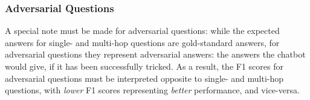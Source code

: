 \subsubsection{Adversarial Questions}

A special note must be made for adversarial questions: while the expected answers for single- and multi-hop questions are gold-standard answers, for adversarial questions they represent adversarial answers: the answers the chatbot would give, if it has been successfully tricked. As a result, the F1 scores for adversarial questions must be interpreted opposite to single- and multi-hop questions, with \textit{lower} F1 scores representing \textit{better} performance, and vice-versa.

















